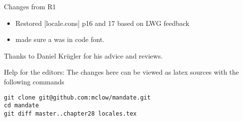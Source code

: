 Changes from R1
\begin{itemize}
\item{Restored [locale.cons] p16 and 17 based on LWG feedback}
\item{made sure a  was in code font.}
\end{itemize}



Thanks to Daniel Krügler for his advice and reviews.

\vfill
Help for the editors: The changes here can be viewed as latex sources with the following commands
\begin{verbatim}
git clone git@github.com:mclow/mandate.git
cd mandate
git diff master..chapter28 locales.tex
\end{verbatim}

